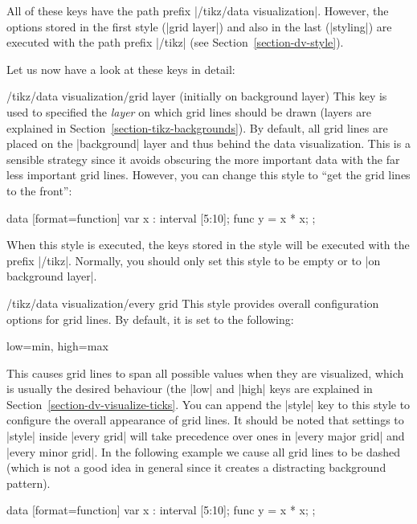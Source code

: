 All of these keys have the path prefix |/tikz/data visualization|. However, the
options stored in the first style (|grid layer|) and also in the last
(|styling|) are executed with the path prefix |/tikz| (see
Section~\ref{section-dv-style}).

Let us now have a look at these keys in detail:

\begin{stylekey}{/tikz/data visualization/grid layer (initially on background layer)}
\label{section-dv-grid-layer}%
    This key is used to specified the \emph{layer} on which grid lines should
    be drawn (layers are explained in Section~\ref{section-tikz-backgrounds}).
    By default, all grid lines are placed on the |background| layer and thus
    behind the data visualization. This is a sensible strategy since it avoids
    obscuring the more important data with the far less important grid lines.
    However, you can change this style to ``get the grid lines to the front'':
\begin{codeexample}[preamble={\usetikzlibrary{datavisualization.formats.functions}}]
\tikz \datavisualization
  [scientific axes,
   all axes={
     length=3cm,
     grid,
     grid={minor steps between steps}
   },
   grid layer/.style=, %
   visualize as line]
  data [format=function] {
    var x : interval [5:10];
    func y = \value x * \value x;
  };
\end{codeexample}
    When this style is executed, the keys stored in the style will be executed
    with the prefix |/tikz|. Normally, you should only set this style to be
    empty or to |on background layer|.
\end{stylekey}

\begin{stylekey}{/tikz/data visualization/every grid}
    This style provides overall configuration options for grid lines. By
    default, it is set to the following:
\begin{codeexample}
low=min, high=max
\end{codeexample}
    This causes grid lines to span all possible values when they are
    visualized, which is usually the desired behaviour (the |low| and |high|
    keys are explained in Section~\ref{section-dv-visualize-ticks}. You can
    append the |style| key to this style to configure the overall appearance of
    grid lines. It should be noted that settings to |style| inside |every grid|
    will take precedence over ones in |every major grid| and |every minor grid|.
    In the following example we cause all grid lines to be dashed (which is not
    a good idea in general since it creates a distracting background pattern).
\begin{codeexample}[preamble={\usetikzlibrary{datavisualization.formats.functions}}]
\tikz \datavisualization
  [scientific axes,
   all axes={length=3cm, grid},
   every grid/.append style={style=densely dashed},
   visualize as line]
  data [format=function] {
    var x : interval [5:10];
    func y = \value x * \value x;
  };
\end{codeexample}
\end{stylekey}

